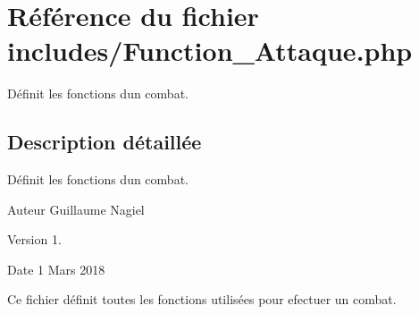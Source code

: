 \hypertarget{_function___attaque_8php}{}\section{Référence du fichier includes/\+Function\+\_\+\+Attaque.php}
\label{_function___attaque_8php}


Définit les fonctions d\textquotesingle{}un combat.  




\subsection{Description détaillée}
Définit les fonctions d\textquotesingle{}un combat. 

\begin{DoxyAuthor}{Auteur}
Guillaume Nagiel 
\end{DoxyAuthor}
\begin{DoxyVersion}{Version}
1. 
\end{DoxyVersion}
\begin{DoxyDate}{Date}
1 Mars 2018
\end{DoxyDate}
Ce fichier définit toutes les fonctions utilisées pour efectuer un combat. 
